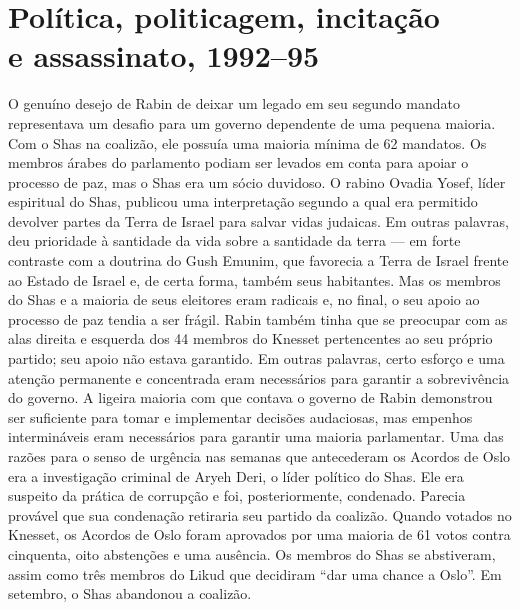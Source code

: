 \chapter[Política, politicagem, incitação e assassinato, 1992--95]{Política, politicagem, incitação\\ e assassinato, 1992--95}

O genuíno desejo de Rabin de deixar um legado em seu segundo mandato
representava um desafio para um governo dependente de uma pequena
maioria. Com o Shas na coalizão, ele possuía uma maioria mínima de 62
mandatos. Os membros árabes do parlamento podiam ser levados em conta
para apoiar o processo de paz, mas o Shas era um sócio duvidoso. O rabino Ovadia Yosef, líder espiritual do Shas, publicou uma interpretação
segundo a qual era permitido devolver partes da Terra de Israel para
salvar vidas judaicas. Em outras palavras, deu prioridade à santidade da
vida sobre a santidade da terra --- em forte contraste com a doutrina do
Gush Emunim, que favorecia a Terra de Israel frente ao Estado de Israel
e, de certa forma, também seus habitantes. Mas os membros do Shas e a
maioria de seus eleitores eram radicais e, no final, o seu apoio ao
processo de paz tendia a ser frágil. Rabin também tinha que se preocupar
com as alas direita e esquerda dos 44 membros do Knesset
pertencentes ao seu próprio partido; seu apoio não estava garantido. Em
outras palavras, certo esforço e uma atenção permanente e concentrada eram
necessários para garantir a sobrevivência do governo. A ligeira maioria
com que contava o governo de Rabin demonstrou ser suficiente para tomar
e implementar decisões audaciosas, mas empenhos intermináveis eram
necessários para garantir uma maioria parlamentar. Uma das razões para o
senso de urgência nas semanas que antecederam os Acordos de Oslo era a
investigação criminal de Aryeh Deri, o líder político do Shas. Ele era
suspeito da prática de corrupção e foi, posteriormente, condenado.
Parecia provável que sua condenação retiraria seu partido da coalizão.
Quando votados no Knesset, os Acordos de Oslo foram aprovados por
uma maioria de 61 votos contra cinquenta, oito abstenções e
uma ausência. Os membros do Shas se abstiveram, assim como três membros
do Likud que decidiram ``dar uma chance a Oslo''. Em setembro, o Shas
abandonou a coalizão.

